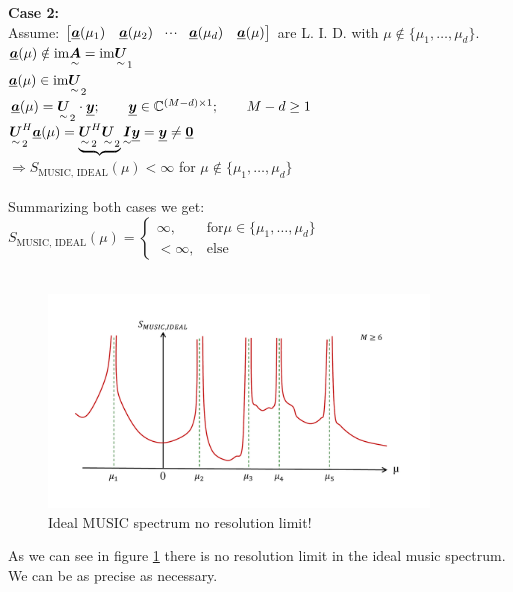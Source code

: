 \textbf{Case 2:}\\
Assume: $\begin{bmatrix} \underline{\boldsymbol {a}}(\mu_1)& \underline{\boldsymbol {a}}(\mu_2) & \!\cdot \!\cdot\!\cdot\! & \underline{\boldsymbol {a}}(\mu_d) & \underline{\boldsymbol {a}}(\mu) \end{bmatrix}$ are L. I. D. with $\mu\notin\{\mu_1,\ldots,\mu_d\}$.\\
$\underline{\boldsymbol {a}}(\mu)\notin\text{im}\underset{\sim}{\boldsymbol {A}}=\text{im}\underset{\sim}{\boldsymbol {U}}_1$\\
$\underline{\boldsymbol {a}}(\mu)\in\text{im}\underset{\sim}{\boldsymbol {U}}_2$\\
$\underline{\boldsymbol {a}}(\mu)=\underset{\sim}{\boldsymbol {U}}_2\cdot\underline{\boldsymbol {y}};\qquad \underline{\boldsymbol {y}}\in\mathbb{C}^{(M-d)\times 1};\qquad M-d\geq1$\\
$\underset{\sim}{\boldsymbol {U}}_2^H\underline{\boldsymbol {a}}(\mu)=\underbrace{\underset{\sim}{\boldsymbol {U}}_2^H\underset{\sim}{\boldsymbol {U}}_2}{\underset{\sim}{\boldsymbol {I}}}\underline{\boldsymbol {y}}=\underline{\boldsymbol {y}}\neq\underline{\boldsymbol {0}}$\\
$\Rightarrow S_{\text{MUSIC, IDEAL}}(\mu)<\infty$ for $\mu\notin\{\mu_1,\ldots,\mu_d\}$\\ \ \\

Summarizing both cases we get:\\
$S_{\text{MUSIC, IDEAL}}(\mu)=\left\lbrace \begin{matrix}\infty,& \text{for} \mu\in\{\mu_1,\ldots,\mu_d\}\\<\infty,&\text{else}\end{matrix} \right.$\\ \ \\

\begin{figure}[H]
	\centering
		\includegraphics[trim =2cm 2cm 2cm 2cm, clip, width=0.90\textwidth]{graphics/Ideal_MUSIC_spectrum.pdf}
	\caption{Ideal MUSIC spectrum \Ra no resolution limit!}
	\label{fig:Ideal_MUSIC_spectrum}
\end{figure}
As we can see in figure \ref{fig:Ideal_MUSIC_spectrum} there is no resolution limit in the ideal music spectrum. We can be as precise as necessary.

